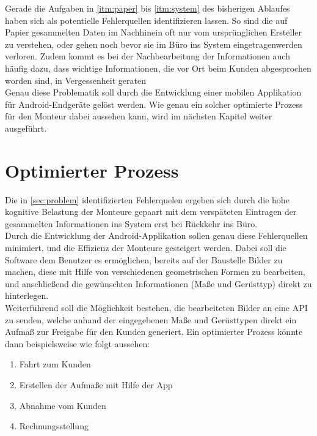 Gerade die Aufgaben in \autoref{itm:paper} bis \autoref{itm:system} des bisherigen Ablaufes haben sich als potentielle Fehlerquellen identifizieren lassen.
So sind die auf Papier gesammelten Daten im Nachhinein oft nur vom ursprünglichen Ersteller zu verstehen, oder gehen noch bevor sie im Büro ins System eingetragenwerden verloren.
Zudem kommt es bei der Nachbearbeitung der Informationen auch häufig dazu, dass wichtige Informationen, die vor Ort beim Kunden abgesprochen worden sind, in Vergessenheit geraten  \\

Genau diese Problematik soll durch die Entwicklung einer mobilen Applikation für Android-Endgeräte gelöst werden.
Wie genau ein solcher optimierte Prozess für den Monteur dabei aussehen kann, wird im nächsten Kapitel weiter ausgeführt.

\section{Optimierter Prozess}
Die in \autoref{sec:problem} identifizierten Fehlerquelen ergeben sich durch die hohe kognitive Belastung der Monteure gepaart mit dem verspäteten Eintragen der gesammelten Informationen ins System erst bei Rückkehr ins Büro. \\

Durch die Entwicklung der Android-Applikation sollen genau diese Fehlerquellen minimiert, und die Effizienz der Monteure gesteigert werden.
Dabei soll die Software dem Benutzer es ermöglichen, bereits auf der Baustelle Bilder zu machen, diese mit Hilfe von verschiedenen geometrischen Formen zu bearbeiten, und anschließend die gewünschten Informationen (Maße und Gerüsttyp) direkt zu hinterlegen. \\

Weiterführend soll die Möglichkeit bestehen, die bearbeiteten Bilder an eine API  zu senden, welche anhand der eingegebenen Maße und Gerüsttypen direkt ein Aufmaß zur Freigabe für den Kunden generiert.
Ein optimierter Prozess könnte dann beispielsweise wie folgt aussehen:

\begin{enumerate}
	\item Fahrt zum Kunden
  \item Erstellen der Aufmaße mit Hilfe der App
	\item Abnahme vom Kunden
	\item Rechnungsstellung
\end{enumerate} 

